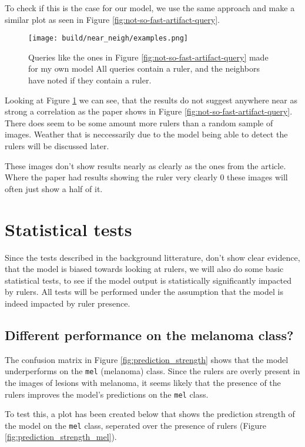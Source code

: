 To check if this is the case for our model, we use the same approach and make a similar plot as seen in Figure \ref{fig:not-so-fast-artifact-query}.

\begin{figure}
    \centering
    \texttt{[image: build/near\_neigh/examples.png]}
    \caption{Queries like the ones in Figure \ref{fig:not-so-fast-artifact-query} made for my own model
        All queries contain a ruler, and the neighbors have noted if they contain a ruler.
    }
    \label{fig:my-artifact-query}
\end{figure}

Looking at Figure \ref{fig:my-artifact-query} we can see, that the results do not
suggest anywhere near as strong a correlation as the paper shows in Figure \ref{fig:not-so-fast-artifact-query}.
There does seem to be some amount more rulers than a random sample of images.
Weather that is neccessarily due to the model being able to detect the rulers will be discussed later.

These images don't show results nearly as clearly as the ones from the article.
Where the paper had results showing the ruler very clearly 0 these images will often just show a half of it.

\section{Statistical tests}
Since the tests described in the background litterature, don't show clear evidence,
that the model is biased towards looking at rulers, we will also do some basic statistical tests,
to see if the model output is statistically significantly impacted by rulers.
All tests will be performed under the assumption that the model is indeed impacted by ruler presence.

\subsection{Different performance on the melanoma class?}\label{sec:different-performance-on-the-melanoma-class}
The confusion matrix in Figure \ref{fig:prediction_strength} shows that the model underperforms on the \verb|mel| (melanoma) class.
Since the rulers are overly present in the images of lesions with melanoma,
it seems likely that the presence of the rulers improves the model's predictions
on the \verb|mel| class.

To test this, a plot has been created below that shows the prediction strength of the model on the \verb|mel| class,
seperated over the presence of rulers (Figure \ref{fig:prediction_strength_mel}).

